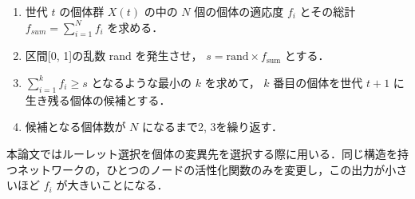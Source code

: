 \begin{enumerate}
    \item 世代 $ t $ の個体群 $ X(t) $ の中の $ N $ 個の個体の適応度 $ f_i $ とその総計 $ f_{sum} = \sum^N_{i=1} f_i $ を求める．

    \item 区間[0, 1]の乱数 rand を発生させ， $ s = \text{rand} \times f_{\text{sum}} $ とする．

    \item $ \sum^k_{i=1} f_i \geq s $ となるような最小の $ k $ を求めて， $ k $ 番目の個体を世代 $ t+1 $ に生き残る個体の候補とする．

    \item 候補となる個体数が $ N $ になるまで2, 3を繰り返す．
\end{enumerate}

本論文ではルーレット選択を個体の変異先を選択する際に用いる．同じ構造を持つネットワークの，ひとつのノードの活性化関数のみを変更し，この出力が小さいほど $ f_i $ が大きいことになる．
